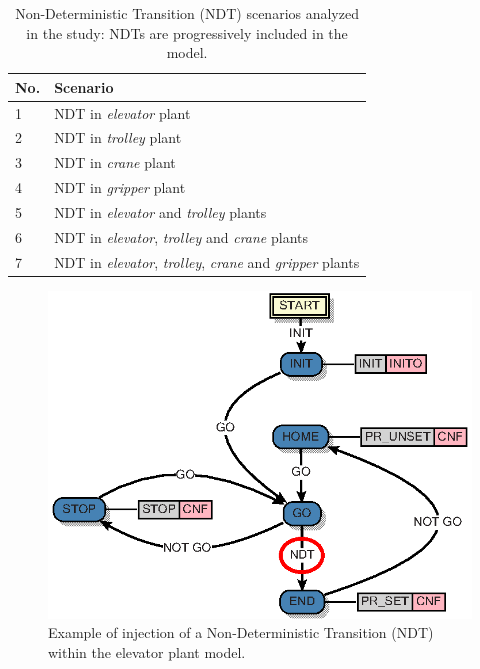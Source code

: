 \documentclass{ieeeojies}
\begin{document}
\begin{table}[b!]
    \centering\small
    \renewcommand{\arraystretch}{1.5}
    \begin{tabularx}{\columnwidth}{ m{} m{} }
        \hline
        No. & Scenario                                                                                   \\ 
        \hline
        1   & NDT in \textit{elevator} plant                                                            \\ 
        2   & NDT in \textit{trolley} plant                                                             \\  
        3   & NDT in \textit{crane} plant                                                               \\ 
        4   & NDT in \textit{gripper} plant                                                             \\ 
        5   & NDT in \textit{elevator} and \textit{trolley} plants                                      \\ 
        6   & NDT in \textit{elevator}, \textit{trolley} and \textit{crane} plants                      \\ 
        7   & NDT in \textit{elevator}, \textit{trolley}, \textit{crane} and \textit{gripper} plants    \\
        \hline
    \end{tabularx}
    \caption{Non-Deterministic Transition (NDT) scenarios analyzed in the study: NDTs are progressively included in the model.}
    \label{table:2}
\end{table}

\begin{figure}[t!]
    \centering
    \includegraphics[width=0.95\columnwidth]{pictures/lilli10.eps}
    \caption{Example of injection of a Non-Deterministic Transition (NDT) within the elevator plant model.}
    \label{fig:ndt}
\end{figure}
\end{document}
